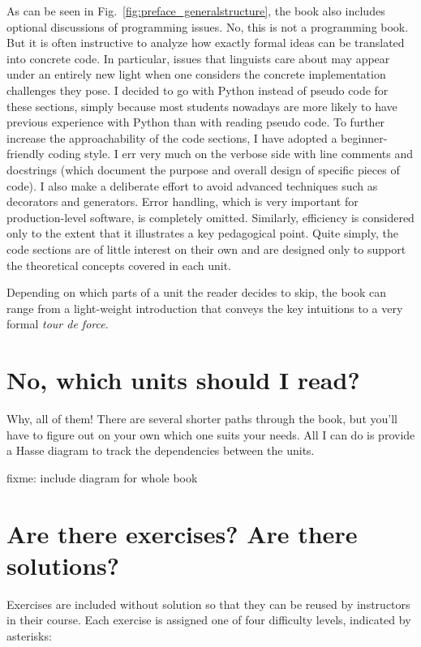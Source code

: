 As can be seen in Fig.~\ref{fig:preface_generalstructure}, the book also includes optional discussions of programming issues.
No, this is not a programming book.
But it is often instructive to analyze how exactly formal ideas can be translated into concrete code.
In particular, issues that linguists care about may appear under an entirely new light when one considers the concrete implementation challenges they pose.
I decided to go with Python instead of pseudo code for these sections, simply because most students nowadays are more likely to have previous experience with Python than with reading pseudo code.
To further increase the approachability of the code sections, I have adopted a beginner-friendly coding style.
I err very much on the verbose side with line comments and docstrings (which document the purpose and overall design of specific pieces of code).
I also make a deliberate effort to avoid advanced techniques such as decorators and generators.
Error handling, which is very important for production-level software, is completely omitted.
Similarly, efficiency is considered only to the extent that it illustrates a key pedagogical point.
Quite simply, the code sections are of little interest on their own and are designed only to support the theoretical concepts covered in each unit.

Depending on which parts of a unit the reader decides to skip, the book can range from a light-weight introduction that conveys the key intuitions to a very formal \emph{tour de force}.


\section*{No, which units should I read?}

Why, all of them!
There are several shorter paths through the book, but you'll have to figure out on your own which one suits your needs.
All I can do is provide a Hasse diagram to track the dependencies between the units.

fixme: include diagram for whole book


\section*{Are there exercises? Are there solutions?}

Exercises are included without solution so that they can be reused by instructors in their course.
Each exercise is assigned one of four difficulty levels, indicated by asterisks:

